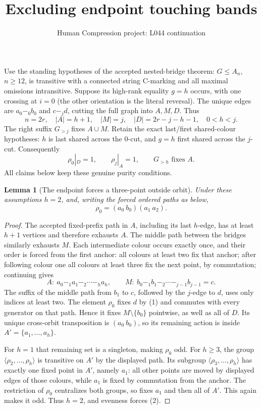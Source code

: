 \documentclass[11pt,a4paper]{article}
\title{Excluding endpoint touching bands}
\author{Human Compression project: L044 continuation}
\date{}
\newtheorem{lemma}{Lemma}
\newcommand{\gen}[1]{\langle#1\rangle}
\begin{document}
\maketitle
Use the standing hypotheses of the accepted nested-bridge theorem:
$G\leq A_n$, $n\geq12$, is transitive with a connected string
C-marking and all maximal omissions intransitive. Suppose its
high-rank equality $g=h$ occurs, with one crossing at $i=0$
(the other orientation is the literal reversal). The unique edges
are $a_0\mathrel{-_0}b_0$ and $c\mathrel{-_j}d$, cutting the full
graph into $A,M,D$. Thus
\[
 n=2r,\quad |A|=h+1,\quad |M|=j,\quad
 |D|=2r-j-h-1,\quad 0<h<j.
\]
The right suffix $G_{>j}$ fixes $A\cup M$.
Retain the exact last/first shared-colour hypotheses: $h$ is
last shared across the $0$-cut, and $g=h$ first shared across
the $j$-cut. Consequently
\[
 \rho_0|_D=1,\qquad \rho_j|_A=1,
 \qquad G_{>h}\text{ fixes }A.                         \tag{1}
\]
All claims below keep these genuine purity conditions.

\begin{lemma}[The endpoint forces a three-point outside orbit]
Under these assumptions $h=2$, and, writing the forced ordered
paths as below,
\[
                  \rho_0=(a_0\ b_0)(a_1\ a_2).         \tag{2}
\]
\end{lemma}
\begin{proof}
The accepted fixed-prefix path in $A$, including its last
$h$-edge, has at least $h+1$ vertices and therefore exhausts $A$.
The middle path between the bridges similarly exhausts $M$.
Each intermediate colour occurs exactly once, and their order
is forced from the first anchor: all colours at least two fix
that anchor; after following colour one all colours at least
three fix the next point, by commutation; continuing gives
\[
 A:\ a_0\mathrel{-_1}a_1\mathrel{-_2}\cdots
       \mathrel{-_h}a_h,\qquad
 M:\ b_0\mathrel{-_1}b_1\mathrel{-_2}\cdots
       \mathrel{-_{j-1}}b_{j-1}=c.
\]
The suffix of the middle path from $b_1$ to $c$, followed by
the $j$-edge to $d$, uses only indices at least two. The element
$\rho_0$ fixes $d$ by (1) and commutes with every generator on
that path. Hence it fixes $M\setminus\{b_0\}$ pointwise, as
well as all of $D$. Its unique cross-orbit transposition is
$(a_0\ b_0)$, so its remaining action is inside
$A'=\{a_1,\ldots,a_h\}$.

For $h=1$ that remaining set is a singleton, making $\rho_0$
odd. For $h\geq3$, the group $\gen{\rho_2,\ldots,\rho_h}$
is transitive on $A'$ by the displayed path. Its subgroup
$\gen{\rho_3,\ldots,\rho_h}$ has exactly one fixed point in
$A'$, namely $a_1$: all other points are moved by displayed
edges of those colours, while $a_1$ is fixed by commutation
from the anchor. The restriction of $\rho_0$ centralizes both
groups, so fixes $a_1$ and then all of $A'$. This again makes
it odd. Thus $h=2$, and evenness forces (2).
\end{proof}
\end{document}
